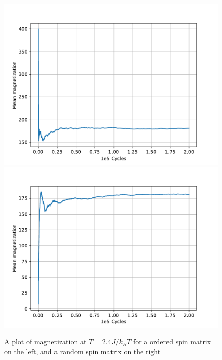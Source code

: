 \documentclass[a4paper]{article}
\begin{document}
\begin{figure}[!htb]
	\centering 
	\includegraphics[scale=0.56]{../opp_c_m_24K_200000_o.pdf}
	\includegraphics[scale=0.56]{../opp_c_m_24K_200000_r.pdf}
	\caption{A plot of magnetization at $T = 2.4 J/k_B T$ for a ordered spin matrix on the left, and a random spin matrix on the right}
	\label{c_m_2.4}
\end{figure}
\end{document}
